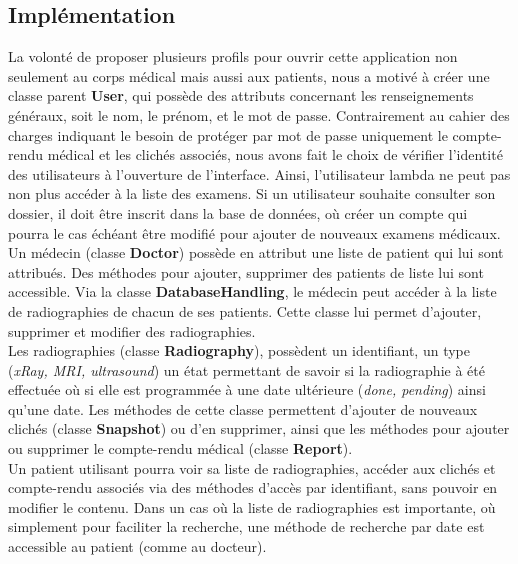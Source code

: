 \documentclass[12pt,a4paper]{article}
\begin{document}
	\begin{multicols}{2}

		\section{Implémentation}
				
		La volonté de proposer plusieurs profils pour ouvrir cette application non seulement au corps médical mais aussi aux patients, nous a motivé à créer une classe parent \textbf{User}, qui possède des attributs concernant les renseignements généraux, soit le nom, le prénom, et le mot de passe. Contrairement au cahier des charges indiquant le besoin de protéger par mot de passe uniquement le compte-rendu médical et les clichés associés, nous avons fait le choix de vérifier l'identité des utilisateurs à l'ouverture de l'interface. Ainsi, l'utilisateur lambda ne peut pas non plus accéder à la liste des examens. Si un utilisateur souhaite consulter son dossier, il doit être inscrit dans la base de données, où créer un compte qui pourra le cas échéant être modifié pour ajouter de nouveaux examens médicaux.\\
		
		Un médecin (classe \textbf{Doctor}) possède en attribut une liste de patient qui lui sont attribués. Des méthodes pour ajouter, supprimer des patients de liste lui sont accessible. Via la classe \textbf{DatabaseHandling}, le médecin peut accéder à la liste de radiographies de chacun de ses patients. Cette classe lui permet d'ajouter, supprimer et modifier des radiographies. \\
		
		Les radiographies (classe \textbf{Radiography}), possèdent un identifiant, un type (\textit{xRay, MRI, ultrasound}) un état permettant de savoir si la radiographie à été effectuée où si elle est programmée à une date ultérieure (\textit{done, pending}) ainsi qu'une date. Les méthodes de cette classe permettent d'ajouter de nouveaux clichés (classe \textbf{Snapshot}) ou d'en supprimer, ainsi que les méthodes pour ajouter ou supprimer le compte-rendu médical (classe \textbf{Report}). \\
		
		Un patient utilisant pourra voir sa liste de radiographies, accéder aux clichés et compte-rendu associés via des méthodes d'accès par identifiant, sans pouvoir en modifier le contenu. Dans un cas où la liste de radiographies est importante, où simplement pour faciliter la recherche, une méthode de recherche par date est accessible au patient (comme au docteur). \\
		

\end{multicols}
\end{document}
